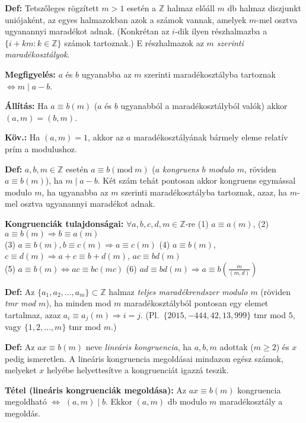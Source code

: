 \documentclass[a4paper, 12pt]{article}
\newcommand{\defi}{{\bf Def:} }
\newcommand{\megf}{{\bf Megfigyelés:} }
\newcommand{\kov}{{\bf Köv.:} }
\newcommand{\all}{{\bf Állítás:} }
\newcommand{\Z}{{\mathbb Z}}
\begin{document}
\defi Tetszőleges rögzített $m>1$ esetén a $\Z$ halmaz előáll $m$ db halmaz
diszjunkt uniójaként, az egyes halmazokban azok a számok vannak, amelyek
$m$-mel osztva ugyanannyi maradékot adnak. (Konkrétan az $i$-dik ilyen
részhalmazba a $\{i+km:k\in \Z\}$ számok tartoznak.) E részhalmazok az \emph{$m$
szerinti maradékosztályok}.

\megf $a$ és $b$ ugyanabba az $m$ szerinti
maradékosztályba tartoznak $\iff m\mid a-b$.

\all Ha $a\equiv b (m)$ ($a$ és $b$ ugyanabból a
maradékosztályból valók) akkor $(a,m)=(b,m)$.

\kov Ha $(a,m)=1$, akkor az $a$ maradékosztályának bármely eleme relatív
prím a modulushoz.

\defi $a,b,m\in \Z$ esetén $a\equiv b(\mathrm{mod}\ m)$ 
(\emph{$a$ kongruens $b$ modulo $m$}, röviden $a\equiv b(m)$), ha $m\mid
a-b$. Két szám tehát pontosan akkor kongruens egymással modulo $m$, ha
ugyanabba az $m$ szerinti maradékosztályba tartoznak, azaz, ha $m$-mel
osztva ugyanannyi maradékot adnak. 

{\bf Kongruenciák tulajdonságai:} $\forall a,b,c,d,m\in\Z$-re
\hfil
(1) $a\equiv a(m)$,
\hfil
(2) $a\equiv b(m)\Rightarrow b\equiv a(m)$\\
(3) $a\equiv b(m), b\equiv c(m)\Rightarrow a\equiv c(m)$\hfil
(4) $a\equiv b(m)$, $c\equiv d(m)\Rightarrow a+c\equiv b+d(m)$, $ac\equiv
bd(m)$ \\
(5) $a\equiv b(m)\iff ac\equiv bc (mc)$\hfil
(6) $ad\equiv bd(m)\Rightarrow a\equiv b\left(\frac m{(m,d)}\right)$

\defi
Az $\{a_1,a_2,\ldots,a_m\}\subset \Z$ halmaz \emph{teljes
maradékrendszer modulo $m$} (röviden \emph{tmr mod $m$}), ha minden mod $m$
maradékosztályból pontosan egy elemet tartalmaz, azaz $a_i\equiv
a_j(m)\Rightarrow i=j$. (Pl.\ $\{2015,-444, 42,13, 999\}$ tmr mod $5$, vagy 
$\{1,2,\ldots,m\}$ tmr mod $m$.)



\defi Az $ax\equiv b(m)$ neve \emph{lineáris kongruencia}, ha $a,b,m$
adottak ($m\ge 2$) és $x$ pedig ismeretlen. A lineáris kongruencia
megoldásai mindazon egész számok, melyeket $x$ helyébe helyettesítve a
kongruenciát igazzá teszik.


 {\bf Tétel (lineáris kongruenciák megoldása):} Az $ax\equiv b(m)$
kongruencia megoldható $\iff$ $(a,m)\mid b$. Ekkor $(a,m)$ db
modulo $m$ maradékosztály a megoldás. 
\end{document}
